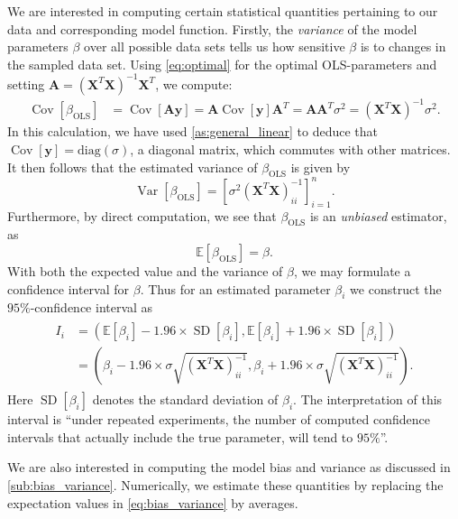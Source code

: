 \documentclass[dvipsnames, article, a4paper, oneside, 12pt]{memoir}
\newcommand{\X}{\bm{X}}
\newcommand{\diag}[1]{\mathrm{diag}(#1)}
\newcommand{\expect}{\mathbb{E}}
\DeclareMathOperator{\var}{Var}
\DeclareMathOperator{\cov}{Cov}
\newcommand{\OLS}{\mathrm{OLS}}
\DeclareMathOperator{\SD}{SD}
\newcommand{\mat}[1]{\bm{#1}}
\newcommand{\y}{\bm{y}}
\begin{document}
  We are interested in computing certain statistical quantities pertaining to
  our data and corresponding model function. Firstly, the \emph{variance} of
  the model parameters \( \beta \) over all possible data sets tells us how
  sensitive \( \beta \) is to changes in the sampled data set. Using
  \cref{eq:optimal} for the optimal OLS-parameters and setting \( \mat{A} =
  (\X^T\X)^{-1}\X^T\), we compute:
  \begin{align}
	  \label{eq:ols_variance}
	  \cov\left[\beta_{\OLS}\right] &= \cov\left[\mat{A}\y\right] = \mat{A} \cov\left[\y\right] \mat{A}^T = \mat{A}\mat{A}^T\sigma^2 = (\X^T{\X})^{-1} \sigma^2.
  \end{align}
  In this calculation, we have used \cref{as:general_linear} to deduce that \(
  \cov[ \y ] = \diag{\sigma}\), a diagonal matrix, which commutes with other
  matrices. It then follows that the estimated variance of \( \beta_{\OLS} \) is given by
  \begin{equation}
	  \var[\beta_{\OLS}] = [\sigma^2 (\X^T\X)^{-1}_{ii} ]_{i=1}^n.
  \end{equation}
  Furthermore, by direct computation, we see that \( \beta_{\OLS} \) is an \emph{unbiased} estimator,
  as 
  \begin{equation}
	  \expect[\beta_{\OLS}] = \beta.
  \end{equation}
  With both the expected value and the variance of \( \beta \), we may
  formulate a confidence interval for \( \beta \). Thus for an estimated
  parameter \( \beta_i \) we construct the
  \(95\%\)-confidence interval as
  \begin{align}
	  \begin{split}
		  I_i &= (\expect[\beta_i] - 1.96 \times \SD[\beta_i], \expect[\beta_i] + 1.96 \times \SD[\beta_i]) \\
		      &= \left(\beta_i - 1.96 \times \sigma \sqrt{(\X^T\X)^{-1}_{ii}}, \beta_i + 1.96 \times \sigma \sqrt{(\X^T\X)^{-1}_{ii}}\right).
	  \end{split}
  \end{align}
  Here \( \SD[\beta_i] \) denotes the standard deviation of \( \beta_i \).  The
  interpretation of this interval is  ``under repeated experiments, the number
  of computed confidence intervals that actually include the true parameter,
  will tend to \( 95\% \)''.
 
  We are also interested in computing the model bias and variance as discussed
  in \cref{sub:bias_variance}. Numerically, we estimate these quantities by
  replacing the expectation values in \cref{eq:bias_variance} by averages.
\end{document}
